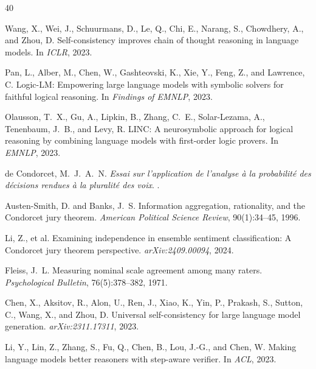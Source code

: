 \documentclass[11pt,a4paper]{article}
\begin{document}
\begin{thebibliography}{40}

Wang, X., Wei, J., Schuurmans, D., Le, Q., Chi, E., Narang, S., Chowdhery, A., and Zhou, D.
\newblock Self-consistency improves chain of thought reasoning in language models.
\newblock In \emph{ICLR}, 2023.

Pan, L., Alber, M., Chen, W., Gashteovski, K., Xie, Y., Feng, Z., and Lawrence, C.
\newblock Logic-LM: Empowering large language models with symbolic solvers for faithful logical reasoning.
\newblock In \emph{Findings of EMNLP}, 2023.

Olausson, T.~X., Gu, A., Lipkin, B., Zhang, C.~E., Solar-Lezama, A., Tenenbaum, J.~B., and Levy, R.
\newblock LINC: A neurosymbolic approach for logical reasoning by combining language models with first-order logic provers.
\newblock In \emph{EMNLP}, 2023.

de Condorcet, M.~J.~A.~N.
\newblock \emph{Essai sur l'application de l'analyse \`{a} la probabilit\'{e} des d\'{e}cisions rendues \`{a} la pluralit\'{e} des voix}.
.

Austen-Smith, D. and Banks, J.~S.
\newblock Information aggregation, rationality, and the {C}ondorcet jury theorem.
\newblock \emph{American Political Science Review}, 90(1):34--45, 1996.

Li, Z., et al.
\newblock Examining independence in ensemble sentiment classification: A {C}ondorcet jury theorem perspective.
\newblock \emph{arXiv:2409.00094}, 2024.

Fleiss, J.~L.
\newblock Measuring nominal scale agreement among many raters.
\newblock \emph{Psychological Bulletin}, 76(5):378--382, 1971.

Chen, X., Aksitov, R., Alon, U., Ren, J., Xiao, K., Yin, P., Prakash, S., Sutton, C., Wang, X., and Zhou, D.
\newblock Universal self-consistency for large language model generation.
\newblock \emph{arXiv:2311.17311}, 2023.

Li, Y., Lin, Z., Zhang, S., Fu, Q., Chen, B., Lou, J.-G., and Chen, W.
\newblock Making language models better reasoners with step-aware verifier.
\newblock In \emph{ACL}, 2023.


\end{thebibliography}
\end{document}
